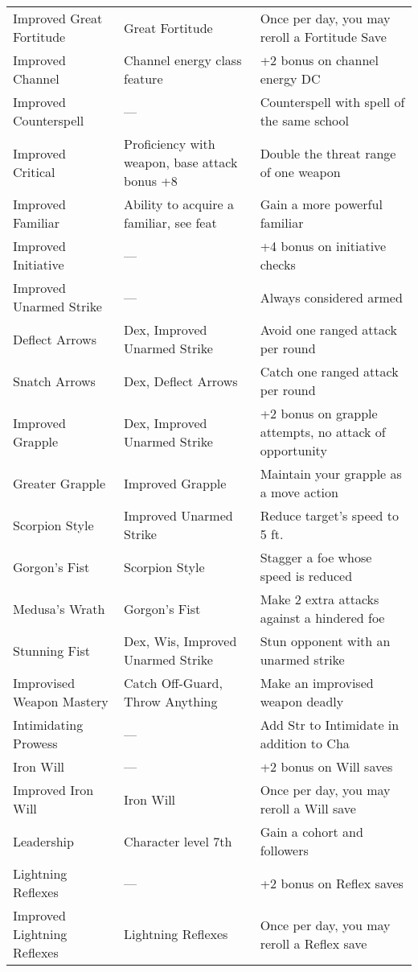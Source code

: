 \begin{table*}[]
\begin{tabularx}{\linewidth}{lXl}
\quad Improved Great Fortitude & Great Fortitude & Once per day, you may reroll a Fortitude Save\\
Improved Channel & Channel energy class feature & +2 bonus on channel energy DC\\
Improved Counterspell & --- & Counterspell with spell of the same school\\
Improved Critical & Proficiency with weapon, base attack bonus +8 & Double the threat range of one weapon\\
Improved Familiar & Ability to acquire a familiar, see feat & Gain a more powerful familiar\\
Improved Initiative & --- & +4 bonus on initiative checks\\
Improved Unarmed Strike & --- & Always considered armed\\
\quad Deflect Arrows & Dex, Improved Unarmed Strike & Avoid one ranged attack per round\\
\quad \quad Snatch Arrows & Dex, Deflect Arrows & Catch one ranged attack per round\\
\quad Improved Grapple & Dex, Improved Unarmed Strike & +2 bonus on grapple attempts, no attack of opportunity\\
\quad \quad Greater Grapple & Improved Grapple & Maintain your grapple as a move action\\
\quad Scorpion Style & Improved Unarmed Strike & Reduce target's speed to 5 ft.\\
\quad \quad Gorgon's Fist & Scorpion Style & Stagger a foe whose speed is reduced\\
\quad \quad \quad Medusa's Wrath & Gorgon's Fist & Make 2 extra attacks against a hindered foe\\
\quad Stunning Fist & Dex, Wis, Improved Unarmed Strike & Stun opponent with an unarmed strike\\
Improvised Weapon Mastery & Catch Off-Guard, Throw Anything & Make an improvised weapon deadly\\
Intimidating Prowess & --- & Add Str to Intimidate in addition to Cha \\
Iron Will & --- & +2 bonus on Will saves\\
\quad Improved Iron Will & Iron Will & Once per day, you may reroll a Will save\\
Leadership & Character level 7th & Gain a cohort and followers\\
Lightning Reflexes & --- & +2 bonus on Reflex saves\\
\quad Improved Lightning Reflexes & Lightning Reflexes & Once per day, you may reroll a Reflex save\\

\end{tabularx}
\end{table*}

